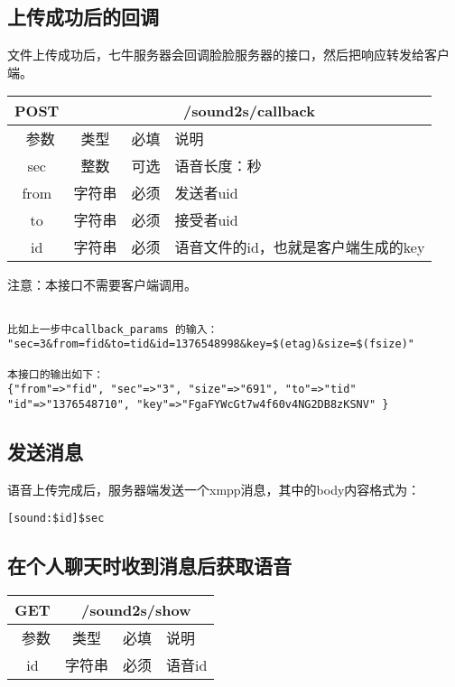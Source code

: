       
\subsection{上传成功后的回调}
文件上传成功后，七牛服务器会回调脸脸服务器的接口，然后把响应转发给客户端。
\begin{table}[H]
   \begin{center}
\begin{tabular}{|c|c|c|p{12cm}|}
\hline
POST & \multicolumn{3}{|c|}{/sound2s/callback} \\
\hline\hline
 \  参数  & 类型 & 必填 &  说明  \\
 \hline
  sec  & 整数 & 可选 &  语音长度：秒\\
  \hline
 from  & 字符串 & 必须 &  发送者uid\\
 \hline
 to  & 字符串 & 必须 &  接受者uid\\
 \hline
 id  & 字符串 & 必须 &  语音文件的id，也就是客户端生成的key\\
 \hline
\end{tabular}
   \end{center}
\end{table}

注意：本接口不需要客户端调用。

\begin{verbatim}

比如上一步中callback_params 的输入：
"sec=3&from=fid&to=tid&id=1376548998&key=$(etag)&size=$(fsize)"

本接口的输出如下：
{"from"=>"fid", "sec"=>"3", "size"=>"691", "to"=>"tid"
"id"=>"1376548710", "key"=>"FgaFYWcGt7w4f60v4NG2DB8zKSNV" } 
\end{verbatim}


\subsection{发送消息}
语音上传完成后，服务器端发送一个xmpp消息，其中的body内容格式为：

\begin{verbatim}
[sound:$id]$sec

\end{verbatim}


\subsection{在个人聊天时收到消息后获取语音}
\begin{table}[H]
   \begin{center}
\begin{tabular}{|c|c|c|p{12cm}|}
\hline
GET & \multicolumn{3}{|c|}{/sound2s/show} \\
\hline\hline
 \  参数  & 类型 & 必填 &  说明  \\
  \hline
 id  & 字符串 & 必须 & 语音id\\
\hline
\end{tabular}
   \end{center}
\end{table}


